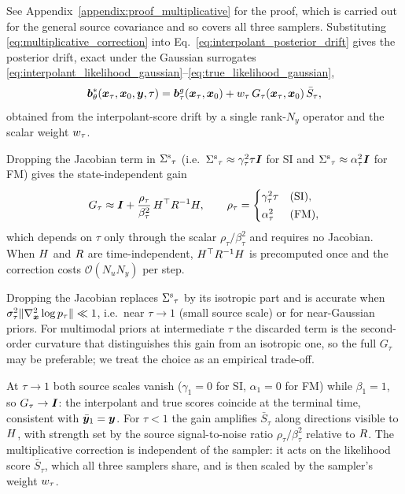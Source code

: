 See Appendix~\ref{appendix:proof_multiplicative} for the proof, which is carried out for the general source covariance and so covers all three samplers. Substituting \eqref{eq:multiplicative_correction} into Eq.~\eqref{eq:interpolant_posterior_drift} gives the posterior drift, exact under the Gaussian surrogates \eqref{eq:interpolant_likelihood_gaussian}--\eqref{eq:true_likelihood_gaussian},
\begin{align}\label{eq:posterior_drift_multiplicative}
    \bm{b}^*_\theta(\boldsymbol{x}_\tau, \boldsymbol{x}_0, \boldsymbol{y}, \tau)
    = \bm{b}^{g}_\tau(\boldsymbol{x}_\tau, \boldsymbol{x}_0)
    + w_\tau\, G_\tau(\boldsymbol{x}_\tau, \boldsymbol{x}_0)\, \bar{S}_\tau,
\end{align}
obtained from the interpolant-score drift by a single rank-$N_y$ operator and the scalar weight $w_\tau$.

\begin{corollary}\label{cor:cheap_drift}
Dropping the Jacobian term in ${\Sigma^{\mathrm{s}}}_\tau$ (i.e.\ ${\Sigma^{\mathrm{s}}}_\tau\approx\gamma_\tau^2\tau\bm{I}$ for SI and ${\Sigma^{\mathrm{s}}}_\tau\approx\alpha_\tau^2\bm{I}$ for FM) gives the state-independent gain
\begin{align}\label{eq:G_cheap}
    G_\tau \approx \bm{I} + \frac{\rho_\tau}{\beta_\tau^2}\, H^\top R^{-1} H,
    \qquad
    \rho_\tau = \begin{cases} \gamma_\tau^2\tau & \text{(SI)},\\[2pt] \alpha_\tau^2 & \text{(FM)},\end{cases}
\end{align}
which depends on $\tau$ only through the scalar $\rho_\tau/\beta_\tau^2$ and requires no Jacobian. When $H$ and $R$ are time-independent, $H^\top R^{-1} H$ is precomputed once and the correction costs $\mathcal{O}(N_u N_y)$ per step.
\end{corollary}

Dropping the Jacobian replaces ${\Sigma^{\mathrm{s}}}_\tau$ by its isotropic part and is accurate when $\sigma_\tau^2\|\nabla_{\boldsymbol{x}}^2\log p_\tau\|\ll1$, i.e.\ near $\tau\to1$ (small source scale) or for near-Gaussian priors. For multimodal priors at intermediate $\tau$ the discarded term is the second-order curvature that distinguishes this gain from an isotropic one, so the full $G_\tau$ may be preferable; we treat the choice as an empirical trade-off.

\begin{remark}
At $\tau\to1$ both source scales vanish ($\gamma_1=0$ for SI, $\alpha_1=0$ for FM) while $\beta_1=1$, so $G_\tau\to\bm{I}$: the interpolant and true scores coincide at the terminal time, consistent with $\bar{\boldsymbol{y}}_1=\boldsymbol{y}$. For $\tau<1$ the gain amplifies $\bar S_\tau$ along directions visible to $H$, with strength set by the source signal-to-noise ratio $\rho_\tau/\beta_\tau^2$ relative to $R$. The multiplicative correction is independent of the sampler: it acts on the likelihood score $\bar S_\tau$, which all three samplers share, and is then scaled by the sampler's weight $w_\tau$.
\end{remark}

